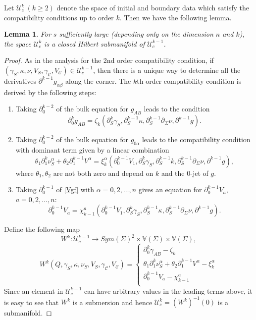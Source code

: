 \documentclass[10pt]{amsart}
\renewcommand{\a}{\alpha}
\renewcommand{\b}{\beta}
\newcommand{\g}{\gamma}
\newcommand{\Si}{\Sigma}
\renewcommand{\k}{\kappa}
\newcommand{\cC}{{\mathcal C}}
\newcommand{\cU}{{\mathcal U}}
\newcommand{\bV}{\mathbb V}
\newcommand{\be}{\begin{equation}}
\newcommand{\ee}{\end{equation}}
\newcommand{\bes}{\begin{equation*}}
\newcommand{\ees}{\end{equation*}}
\newcommand{\p}{\partial}
\renewcommand{\to}{\rightarrow}
\newcommand{\<}{\langle}
\renewcommand{\>}{\rangle}
\theoremstyle{plain}
\newtheorem{lemma}{Lemma}[section]
\theoremstyle{remark}
\theoremstyle{definition}
\numberwithin{equation}{section}
\begin{document}
Let $\cU_c^k~(k\geq 2)$ denote the space of initial and boundary data which satisfy the compatibility conditions up to order $k$. Then we have the following lemma.
\begin{lemma}\label{Compatibility}
For $s$ sufficiently large (depending only on the dimension $n$ and $k$), the space $\cU_c^{k}$ is a closed Hilbert submanifold of $\cU_c^{k-1}$. 
\end{lemma}
\begin{proof}
As in the analysis for the 2nd order compatibility condition, if $(\g_S, \k, \nu, V_S, \g_{\cC}, V_{\cC}) \in \cU_c^{k-1}$, then there is a unique way to determine 
all the derivatives $\p^{k-1} g_{\a\b}$ along the corner. The $k$th order compatibility condition is derived by the following steps:
\begin{enumerate}
\item Taking $\p_0^{k-2}$ of the bulk equation for $g_{AB}$ leads to the condition
\bes
\p_0^k g_{AB}=\zeta_k(\p^k_S \g_S,\p_S^{k-1}\k,\p^{k-1}_S\p_\Si \nu,\p^{k-1} g). 
\ees
\item Taking $\p_0^{k-2}$ of the bulk equation for $g_{0\a}$ leads to the compatibility condition with dominant term given by a linear combination 
\bes
\theta_1\p_1^k \nu_S^\a+\theta_2\p_1^{k-1} V^\a=\xi^\a_k(\p^{k-1}_0 V_1,\p^k_S \g_S,\p_S^{k-1}k,\p^{k-1}_S\p_\Si \nu,\p^{k-1} g), 
\ees
where $\theta_1,\theta_2$ are not both zero and depend on $k$ and the 0-jet of $g$.
\item Taking $\p_0^{k-1}$ of \eqref{Vgf} with $\a=0,2,\dots, n$ gives an equation for $\p_0^{k-1}V_a$, $a=0,2, \dots, n$:
\bes
\p_0^{k-1}V_a=\chi^{a}_{k-1}(\p^{k-1}_0 V_1,\p^k_S \g_S,\p_S^{k-1}\k,\p^{k-1}_S\p_\Si \nu,\p^{k-1} g). 
\ees
\end{enumerate}
    Define the following map 
\be \label{CompOp}
W^k: \cU_c^{k-1} \to Sym(\Si)^2 \times \bV(\Si) \times \bV(\Si),
\ee
\bes
W^k(Q, \g_S, \k, \nu_S, V_S, \g_{\cC}, V_{\cC}) = 
\left\{ 
\begin{array}{l}
\p_0^k \g_{AB}-\zeta_k\\
\theta_1\p_1^k \nu_S^\a+\theta_2\p_1^{k-1} V^\a-\xi_k^\a\\
\p_0^{k-1}V_a-\chi_{k-1}^a\\
\end{array}\right.
\ees
Since an element in $\cU_c^{k-1} $ can have arbitrary values in the leading terms above, it is easy to see that $W^k$ is a submersion and hence 
$\cU_c^{k}=(W^k)^{-1}(0)$ is a submanifold. 

\end{proof}
\end{document}
